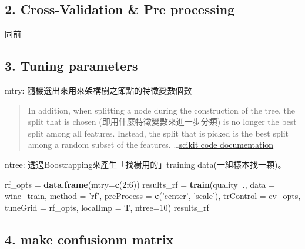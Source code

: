 \documentclass[]{book}
\newenvironment{Shaded}{\begin{snugshade}}{\end{snugshade}}
\newcommand{\KeywordTok}[1]{\textcolor[rgb]{0.13,0.29,0.53}{\textbf{#1}}}
\newcommand{\DataTypeTok}[1]{\textcolor[rgb]{0.13,0.29,0.53}{#1}}
\newcommand{\DecValTok}[1]{\textcolor[rgb]{0.00,0.00,0.81}{#1}}
\newcommand{\StringTok}[1]{\textcolor[rgb]{0.31,0.60,0.02}{#1}}
\newcommand{\OperatorTok}[1]{\textcolor[rgb]{0.81,0.36,0.00}{\textbf{#1}}}
\newcommand{\NormalTok}[1]{#1}
\begin{document}
\hypertarget{cross-validation-pre-processing-1}{%
\subsection{2. Cross-Validation \& Pre processing}\label{cross-validation-pre-processing-1}}

同前

\hypertarget{tuning-parameters-1}{%
\subsection{3. Tuning parameters}\label{tuning-parameters-1}}

mtry: 隨機選出來用來架構樹之節點的特徵變數個數

\begin{quote}
In addition, when splitting a node during the construction of the tree, the split that is chosen (即用什麼特徵變數來進一步分類) is no longer the best split among all features. Instead, the split that is picked is the best split among a random subset of the features. \ldots{}\href{https://scikit-learn.org/stable/modules/ensemble.html\#forest}{scikit code documentation}
\end{quote}

ntree: 透過Boostrapping來產生「找樹用的」training data(一組樣本找一顆)。

\begin{Shaded}
\begin{Highlighting}[]
\NormalTok{rf_opts =}\StringTok{ }\KeywordTok{data.frame}\NormalTok{(}\DataTypeTok{mtry=}\KeywordTok{c}\NormalTok{(}\DecValTok{2}\OperatorTok{:}\DecValTok{6}\NormalTok{))}
\NormalTok{results_rf =}\StringTok{ }\KeywordTok{train}\NormalTok{(quality}\OperatorTok{~}\NormalTok{., }
                   \DataTypeTok{data =}\NormalTok{ wine_train,}
                   \DataTypeTok{method =} \StringTok{'rf'}\NormalTok{,}
                   \DataTypeTok{preProcess =} \KeywordTok{c}\NormalTok{(}\StringTok{'center'}\NormalTok{, }\StringTok{'scale'}\NormalTok{),}
                   \DataTypeTok{trControl =}\NormalTok{ cv_opts,}
                   \DataTypeTok{tuneGrid =}\NormalTok{ rf_opts,}
                   \DataTypeTok{localImp =}\NormalTok{ T,}
                   \DataTypeTok{ntree=}\DecValTok{10}\NormalTok{)}
\NormalTok{results_rf}
\end{Highlighting}
\end{Shaded}

\hypertarget{make-confusionm-matrix}{%
\subsection{4. make confusionm matrix}\label{make-confusionm-matrix}}
\end{document}

